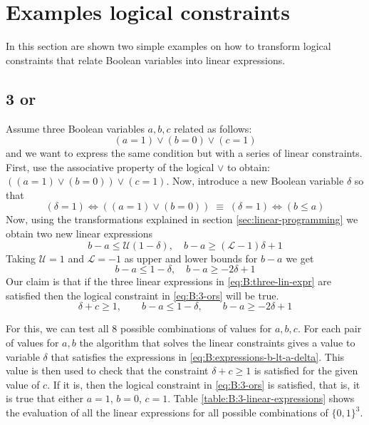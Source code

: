 \section{Examples logical constraints}
\label{sec:examples-logical-constraints}

In this section are shown two simple examples on how to transform logical
constraints that relate Boolean variables into linear expressions.

\subsection{3 or}
\label{sec:examples-logical-constraints:3-ors}

Assume three Boolean variables $a,b,c$ related as follows:
\begin{equation}
\label{eq:B:3-ors}
(a = 1) \vee (b = 0) \vee (c = 1)
\end{equation}
and we want to express the same condition but with a series of
linear constraints. First, use the associative property of the logical $\vee$
to obtain: $((a = 1) \vee (b = 0)) \vee (c = 1)$.
Now, introduce a new Boolean variable $\delta$ so that
\[
(\delta = 1) \Longleftrightarrow ((a = 1) \vee (b = 0))
\;\equiv\;
(\delta = 1) \Longleftrightarrow (b \le a)
\]
Now, using the transformations explained in section \ref{sec:linear-programming}
we obtain two new linear expressions
\[
b - a \le \mathcal{U}(1 - \delta), \quad b - a \ge (\mathcal{L} - 1)\delta + 1
\]
Taking $\mathcal{U}=1$ and $\mathcal{L}=-1$ as upper and lower bounds for $b - a$
we get
\begin{equation}
\label{eq:B:expressions-b-lt-a-delta}
b - a \le 1 - \delta, \quad b - a \ge -2\delta + 1
\end{equation}
Our claim is that if the three linear expressions in \ref{eq:B:three-lin-expr}
are satisfied then the logical constraint in \ref{eq:B:3-ors} will be true.
\begin{equation}
\label{eq:B:three-lin-expr}
\delta + c \ge 1,\qquad b - a \le 1 - \delta,\qquad b - a \ge -2\delta + 1
\end{equation}

For this, we can test all 8 possible combinations of values for $a,b,c$. For each pair
of values for $a,b$ the algorithm that solves the linear constraints gives a value to
variable $\delta$ that satisfies the expressions in \ref{eq:B:expressions-b-lt-a-delta}.
This value is then used to check that the constraint $\delta + c \ge 1$ is satisfied
for the given value of $c$. If it is, then the logical constraint in \ref{eq:B:3-ors}
is satisfied, that is, it is true that either $a=1$, $b=0$, $c=1$. Table
\ref{table:B:3-linear-expressions} shows the evaluation of all the linear expressions
for all possible combinations of $\{0,1\}^3$.

